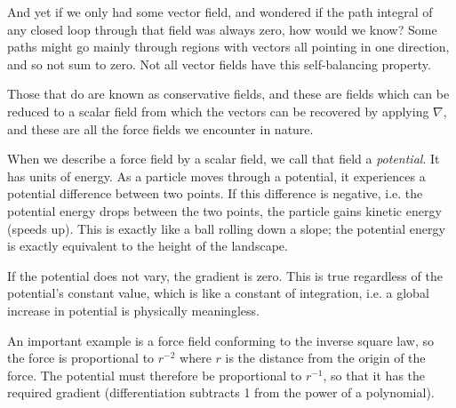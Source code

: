 And yet if we only had some vector field, and wondered if the path integral of any closed loop through that field was always zero, how would we know? Some paths might go mainly through regions with vectors all pointing in one direction, and so not sum to zero. Not all vector fields have this self-balancing property.

Those that do are known as conservative fields, and these are fields which can be reduced to a scalar field from which the vectors can be recovered by applying $\nabla$, and these are all the force fields we encounter in nature.

When we describe a force field by a scalar field, we call that field a \textit{potential}. It has units of energy. As a particle moves through a potential, it experiences a potential difference between two points. If this difference is negative, i.e. the potential energy drops between the two points, the particle gains kinetic energy (speeds up). This is exactly like a ball rolling down a slope; the potential energy is exactly equivalent to the height of the landscape.

If the potential does not vary, the gradient is zero. This is true regardless of the potential's constant value, which is like a constant of integration, i.e. a global increase in potential is physically meaningless.

An important example is a force field conforming to the inverse square law, so the force is proportional to $r^{-2}$ where $r$ is the distance from the origin of the force. The potential must therefore be proportional to $r^{-1}$, so that it has the required gradient (differentiation subtracts 1 from the power of a polynomial).
